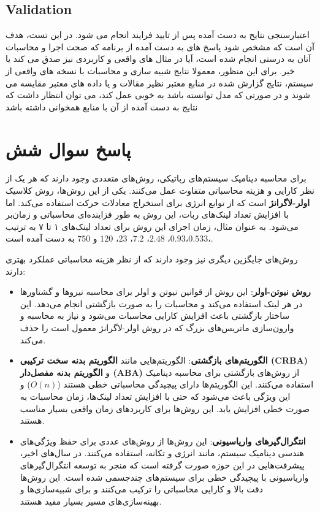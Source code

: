 \subsection*{Validation}
اعتبارسنجی نتایح به دست آمده پس از تایید فرایند انجام می شود. در این تست، هدف آن است که مشخص شود پاسخ های به دست آمده از برنامه که صحت اجرا و محاسبات آنان به درستی انجام شده است، آیا در مثال های واقعی و کاربردی نیز صدق می کند یا خیر. برای این منظور، معمولا نتایج شبیه سازی و محاسبات با نسخه های واقعی از سیستم، نتایج گزارش شده در منابع معتبر نظیر مقالات و یا داده های معتبر مقایسه می شوند و در صورتی که مدل توانسته باشد به خوبی عمل کند، می توان انتظار داشت که نتایج به دست آمده از آن با منابع همخوانی داشته باشد

\section*{پاسخ سوال شش}
برای محاسبه دینامیک سیستم‌های رباتیکی، روش‌های متعددی وجود دارند که هر یک از نظر کارایی و هزینه محاسباتی متفاوت عمل می‌کنند. یکی از این روش‌ها، روش کلاسیک \textbf{اولر-لاگرانژ} است که از توابع انرژی برای استخراج معادلات حرکت استفاده می‌کند. اما با افزایش تعداد لینک‌های ربات، این روش به طور فزاینده‌ای محاسباتی و زمان‌بر می‌شود. به عنوان مثال، زمان اجرای این روش برای تعداد لینک‌های ۱ تا ۷ به ترتیب$0.533،$،$0.93$، $2.48$، $7.2$، $23$، $120$   و $750$ به دست آمده است.
	
روش‌های جایگزین دیگری نیز وجود دارند که از نظر هزینه محاسباتی عملکرد بهتری دارند:

	\begin{itemize}
		\item \textbf{روش نیوتن-اولر}:
این روش از قوانین نیوتن و اولر برای محاسبه نیروها و گشتاورها در هر لینک استفاده می‌کند و محاسبات را به صورت بازگشتی انجام می‌دهد. این ساختار بازگشتی باعث افزایش کارایی محاسبات می‌شود و نیاز به محاسبه و وارون‌سازی ماتریس‌های بزرگ که در روش اولر-لاگرانژ معمول است را حذف می‌کند.
		
		\item \textbf{الگوریتم‌های بازگشتی}:
الگوریتم‌هایی مانند \textbf{الگوریتم بدنه سخت ترکیبی (CRBA)} و \textbf{الگوریتم بدنه مفصل‌دار (ABA)} از روش‌های بازگشتی برای محاسبه دینامیک استفاده می‌کنند. این الگوریتم‌ها دارای پیچیدگی محاسباتی خطی هستند ($O(n)$) و این ویژگی باعث می‌شود که حتی با افزایش تعداد لینک‌ها، زمان محاسبات به صورت خطی افزایش یابد. این روش‌ها برای کاربردهای زمان واقعی بسیار مناسب هستند.
		
		\item \textbf{انتگرال‌گیرهای واریاسیونی}:
این روش‌ها از روش‌های عددی برای حفظ ویژگی‌های هندسی دینامیک سیستم، مانند انرژی و تکانه، استفاده می‌کنند. در سال‌های اخیر، پیشرفت‌هایی در این حوزه صورت گرفته است که منجر به توسعه انتگرال‌گیرهای واریاسیونی با پیچیدگی خطی برای سیستم‌های چندجسمی شده است. این روش‌ها دقت بالا و کارایی محاسباتی را ترکیب می‌کنند و برای شبیه‌سازی‌ها و بهینه‌سازی‌های مسیر بسیار مفید هستند.
	\end{itemize}
	
